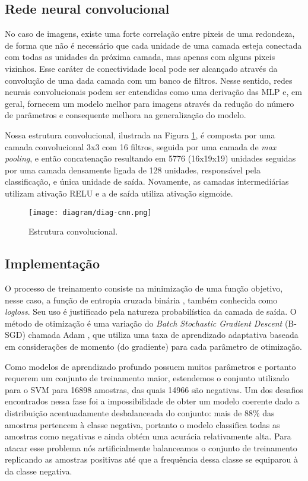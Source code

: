     \subsection{Rede neural convolucional}
         No caso de imagens, existe uma forte correlação entre pixeis de uma redondeza, de forma que não é necessário que cada unidade de uma camada esteja conectada com todas as unidades da próxima camada, mas apenas com alguns pixeis vizinhos. Esse caráter de conectividade local pode ser alcançado através da convolução de uma dada camada com um banco de filtros. Nesse sentido, redes neurais convolucionais podem ser entendidas como uma derivação das MLP e, em geral, fornecem um modelo melhor para imagens através da redução do número de parâmetros e consequente melhora na generalização do modelo.

         Nossa estrutura convolucional, ilustrada na Figura \ref{fig:diag-cnn}, é composta por uma camada convolucional 3x3 com 16 filtros, seguida por uma camada de \textit{max pooling}, e então concatenação resultando em 5776 (16x19x19) unidades seguidas por uma camada densamente ligada de 128 unidades, responsável pela classificação, e única unidade de saída. Novamente, as camadas intermediárias utilizam ativação RELU e a de saída utiliza ativação sigmoide.

        \begin{figure}
        \centering
        \texttt{[image: diagram/diag-cnn.png]}
        \caption{Estrutura convolucional.}
        \label{fig:diag-cnn}
        \end{figure}

    \subsection{Implementação}
        O processo de treinamento consiste na minimização de uma função objetivo, nesse caso, a função de entropia cruzada binária \cite{DLbook}, também conhecida como \textit{logloss}. Seu uso é justificado pela natureza probabilística da camada de saída. O método de otimização é uma variação do \textit{Batch Stochastic Gradient Descent} (B-SGD) chamada Adam \cite{kingma2014adam}, que utiliza uma taxa de aprendizado adaptativa baseada em considerações de momento (do gradiente) para cada parâmetro de otimização.

        Como modelos de aprendizado profundo possuem muitos parâmetros e portanto requerem um conjunto de treinamento maior, estendemos o conjunto utilizado para o SVM para 16898 amostras, das quais 14966 são negativas. Um dos desafios encontrados nessa fase foi a impossibilidade de obter um modelo coerente dado a distribuição acentuadamente desbalanceada do conjunto: mais de 88\% das amostras pertencem à classe negativa, portanto o modelo classifica todas as amostras como negativas e ainda obtém uma acurácia relativamente alta. Para atacar esse problema nós artificialmente balanceamos o conjunto de treinamento replicando as amostras positivas até que a frequência dessa classe se equiparou à da classe negativa.

